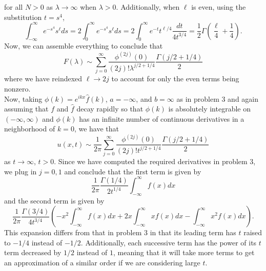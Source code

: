 \documentclass{article}
\begin{document}
for all $N>0$ as $\lambda\to\infty$ when $\lambda>0$. Additionally, when $\ell$ is even, using the substitution $t=s^4$,
\[
\int_{-\infty}^{\infty} e^{-s^4}s^\ell ds=2\int_{0}^{\infty} e^{-s^4}s^\ell ds=2\int_{0}^{\infty} e^{-t}t^{\ell/4}\frac{dt}{4t^{3/4}}=\frac{1}{2}\Gamma(\frac{\ell}{4}+\frac{1}{4}).
\]
Now, we can assemble everything to conclude that 
\[
F(\lambda)\sim\sum_{j=0}^\infty\frac{\phi^{(2j)}(0)}{(2j)!\lambda^{j/2+1/4}}\frac{\Gamma(j/2+1/4)}{2}
\]
where we have reindexed $\ell\to2j$ to account for only the even terms being nonzero.\\
Now, taking $\phi(k)=e^{ikx}\hat{f}(k)$, $a=-\infty$, and $b=\infty$ as in problem 3 and again assuming that $f$ and $\hat{f}$ decay rapidly so that $\phi(k)$ is absolutely integrable on $(-\infty,\infty)$ and $\phi(k)$ has an infinite number of continuous derivatives in a neighborhood of $k=0$, we have that 
\[
u(x,t)\sim\frac{1}{2\pi} \sum_{j=0}^\infty\frac{\phi^{(2j)}(0)}{(2j)!t^{j/2+1/4}}\frac{\Gamma(j/2+1/4)}{2}
\]
as $t\to\infty$, $t>0$. Since we have computed the required derivatives in problem 3, we plug in $j=0,1$ and conclude that the first term is given by 
\[
\frac{1}{2\pi}\frac{\Gamma(1/4)}{2t^{1/4}}\int_{-\infty}^\infty f(x)dx
\]
and the second term is given by
\[
\frac{1}{2\pi}\frac{\Gamma(3/4)}{4t^{3/4}}\left(-x^2\int_{-\infty}^\infty f(x)dx+2x\int_{-\infty}^\infty xf(x)dx-\int_{-\infty}^\infty x^2f(x)dx\right).
\]
This expansion differs from that in problem 3 in that its leading term has $t$ raised to $-1/4$ instead of $-1/2$. Additionally, each successive term has the power of its $t$ term decreased by $1/2$ instead of $1$, meaning that it will take more terms to get an approximation of a similar order if we are considering large $t$. 
	
\end{document}
